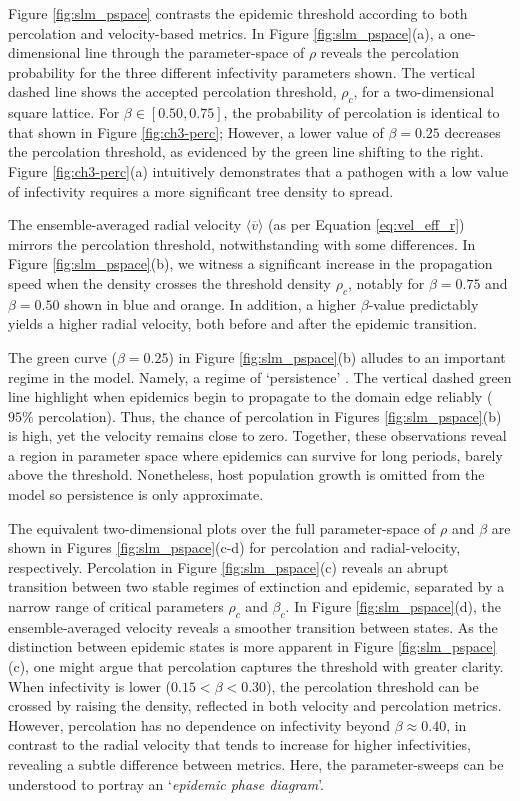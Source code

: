 Figure \ref{fig:slm_pspace} contrasts the epidemic threshold according to both percolation and velocity-based metrics.
In Figure \ref{fig:slm_pspace}(a), a one-dimensional line through the parameter-space of $\rho$ reveals the percolation probability for the three different infectivity parameters shown.
The vertical dashed line shows the accepted percolation threshold, $\rho_c$, for a two-dimensional square lattice. 
For $\beta \in [0.50, 0.75]$, the probability of percolation is identical to that shown in Figure \ref{fig:ch3-perc};
However, a lower value of $\beta = 0.25$ decreases the percolation threshold, as evidenced by the green line shifting to the right.
Figure \ref{fig:ch3-perc}(a) intuitively demonstrates that a pathogen with a low value of infectivity requires a more significant tree density to spread.

The ensemble-averaged radial velocity $\big\langle \overline{v} \big\rangle$ (as per Equation \ref{eq:vel_eff_r}) mirrors the percolation threshold,
notwithstanding with some differences.
In Figure \ref{fig:slm_pspace}(b), we witness a significant increase in the propagation speed when the density crosses the threshold density $\rho_c$, 
notably for $\beta=0.75$ and $\beta=0.50$ shown in blue and orange. 
In addition, a higher $\beta$-value predictably yields a higher radial velocity, both before and after the epidemic transition.

The green curve ($\beta=0.25$) in Figure \ref{fig:slm_pspace}(b) alludes to an important regime in the model.
Namely, a regime of `persistence' \cite{gilligan2008epidemiological}.
The vertical dashed green line highlight when epidemics begin to propagate to the domain edge reliably ($95\%$ percolation).
Thus, the chance of percolation in Figures \ref{fig:slm_pspace}(b) is high, yet the velocity remains close to zero.
Together, these observations reveal a region in parameter space where epidemics can survive for long periods, barely above the threshold.
Nonetheless, host population growth is omitted from the model so persistence is only approximate.

The equivalent two-dimensional plots over the full parameter-space of $\rho$ and $\beta$ are shown in Figures \ref{fig:slm_pspace}(c-d) for percolation and radial-velocity, respectively. 
Percolation in Figure \ref{fig:slm_pspace}(c) reveals an abrupt transition between two stable regimes of extinction and epidemic, separated by a narrow range of critical parameters $\rho_c$ and $\beta_c$.
In Figure \ref{fig:slm_pspace}(d), the ensemble-averaged velocity reveals a smoother transition between states.
As the distinction between epidemic states is more apparent in Figure \ref{fig:slm_pspace}(c), one might argue that percolation captures the threshold with greater clarity.
When infectivity is lower ($0.15 <\beta<0.30$), the percolation threshold can be crossed by raising the density, reflected in both velocity and percolation metrics.
However, percolation has no dependence on infectivity beyond $\beta \approx 0.40$, in contrast to the radial velocity that tends to increase for higher infectivities, revealing a subtle difference between metrics.
Here, the parameter-sweeps can be understood to portray an `\textit{epidemic phase diagram}'.

